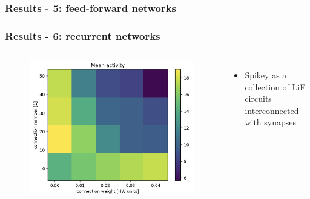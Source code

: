 \documentclass{beamer}
\begin{document}
\begin{frame}
    \frametitle{Results - 5: feed-forward networks} 
\end{frame}

\begin{frame}
    \frametitle{Results - 6: recurrent networks} 
    \begin{columns}
          	\begin{figure}
    				\centering
    				\includegraphics[width=\linewidth]{figures/activity_sweep.png}
 		   \end{figure}
 		   \begin{itemize}
          		\item Spikey as a collection of LiF circuits interconnected with synapses
          	\end{itemize}
          

\end{columns}
\end{frame}
\end{document}
